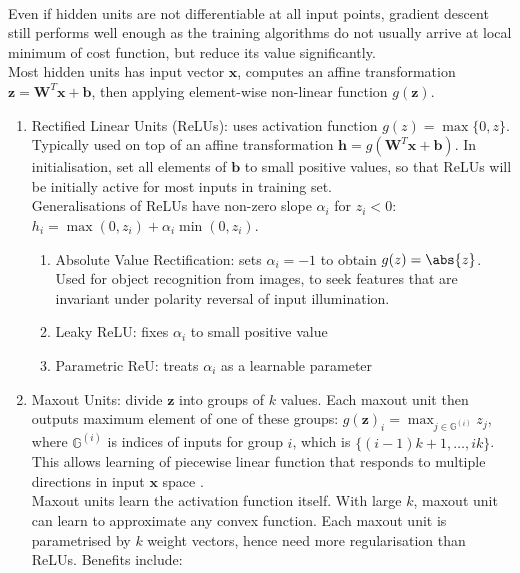 \begin{definition} \\
Even if hidden units are not differentiable at all input points, gradient descent still performs well enough as the training algorithms do not usually arrive at local minimum of cost function, but reduce its value significantly.\\
Most hidden units has input vector $\bm{x}$, computes an affine transformation $\bm{z} = \bm{W}^T \bm{x} + \bm{b}$, then applying element-wise non-linear function $g(\bm{z})$.
\begin{enumerate}[label=\roman*.]
\setlength{\itemsep}{0pt}
\item Rectified Linear Units (ReLUs): uses activation function $g(z) = \max \{0, z\}$.\\
Typically used on top of an affine transformation $\bm{h} = g(\bm{W}^T \bm{x} + \bm{b})$. In initialisation, set all elements of $\bm{b}$ to small positive values, so that ReLUs will be initially active for most inputs in training set.\\
Generalisations of ReLUs have non-zero slope $\alpha_i$ for $z_i < 0$: $h_i = \max(0, z_i) + \alpha_i \min(0, z_i)$.
\begin{enumerate}[label=\arabic*.]
\setlength{\itemsep}{0pt}
\item Absolute Value Rectification: sets $\alpha_i = -1$ to obtain $g(z) = \abs{z}$. Used for object recognition from images, to seek features that are invariant under polarity reversal of input illumination.
\item Leaky ReLU: fixes $\alpha_i$ to small positive value
\item Parametric ReU: treats $\alpha_i$ as a learnable parameter
\end{enumerate}
\item Maxout Units: divide $\bm{z}$ into groups of $k$ values. Each maxout unit then outputs maximum element of one of these groups: $g(\bm{z})_i = \max_{j \in \mathbb{G}^{(i)}} z_j$, where $\mathbb{G}^{(i)}$ is indices of inputs for group $i$, which is $\{(i-1)k + 1, \ldots, ik\}$.\\
This allows learning of piecewise linear function that responds to multiple directions in input $\bm{x}$ space .\\
Maxout units learn the activation function itself. With large $k$, maxout unit can learn to approximate any convex function. Each maxout unit is parametrised by $k$ weight vectors, hence need more regularisation than ReLUs. Benefits include:

\end{enumerate}
\end{definition}
